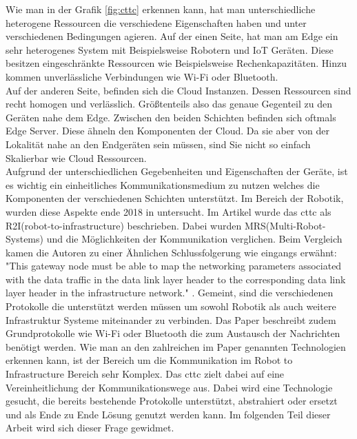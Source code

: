 Wie man in der Grafik \ref{fig:cttc} erkennen kann, hat man unterschiedliche heterogene Ressourcen die verschiedene Eigenschaften haben und unter verschiedenen Bedingungen agieren. Auf der einen Seite, hat man am Edge ein sehr heterogenes System mit Beispielsweise Robotern und IoT Geräten. Diese besitzen eingeschränkte Ressourcen wie Beispielsweise Rechenkapazitäten. Hinzu kommen unverlässliche Verbindungen wie Wi-Fi oder Bluetooth.\\
Auf der anderen Seite, befinden sich die Cloud Instanzen. Dessen Ressourcen sind recht homogen und verlässlich. Größtenteils also das genaue Gegenteil zu den Geräten nahe dem Edge. Zwischen den beiden Schichten befinden sich oftmals Edge Server. Diese ähneln den Komponenten der Cloud. Da sie aber von der Lokalität nahe an den Endgeräten sein müssen, sind Sie nicht so einfach Skalierbar wie Cloud Ressourcen.\\
Aufgrund der unterschiedlichen Gegebenheiten und Eigenschaften der Geräte, ist es wichtig ein einheitliches Kommunikationsmedium zu nutzen welches die Komponenten der verschiedenen Schichten unterstützt. Im Bereich der Robotik, wurden diese Aspekte ende 2018 in \cite{jawharNetworkingMultiRobotSystems2018} untersucht. Im Artikel wurde das \acrlong{cttc} als R2I(robot-to-infrastructure) beschrieben. Dabei wurden MRS(Multi-Robot-Systems) und die Möglichkeiten der Kommunikation verglichen. Beim Vergleich kamen die Autoren zu einer Ähnlichen Schlussfolgerung wie eingangs erwähnt: "This gateway node must be able to map the networking parameters associated with the data traffic in the data link layer header to the corresponding data link layer header in the infrastructure network." \cite{jawharNetworkingMultiRobotSystems2018}. Gemeint, sind die verschiedenen Protokolle die unterstützt werden müssen um sowohl Robotik als auch weitere Infrastruktur Systeme miteinander zu verbinden. Das Paper beschreibt zudem Grundprotokolle wie Wi-Fi oder Bluetooth die zum Austausch der Nachrichten benötigt werden. Wie man an den zahlreichen im Paper genannten Technologien erkennen kann, ist der Bereich um die Kommunikation im Robot to Infrastructure Bereich sehr Komplex. Das \acrlong{cttc} zielt dabei auf eine Vereinheitlichung der Kommunikationswege aus. Dabei wird eine Technologie gesucht, die bereits bestehende Protokolle unterstützt, abstrahiert oder ersetzt und als Ende zu Ende Lösung genutzt werden kann. Im folgenden Teil dieser Arbeit wird sich dieser Frage gewidmet.
